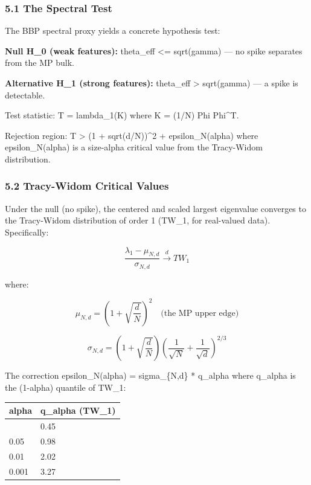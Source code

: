 \documentclass[
  12pt,
]{article}
\begin{document}
\subsubsection{5.1 The Spectral Test}\label{the-spectral-test}

The BBP spectral proxy yields a concrete hypothesis test:

\textbf{Null H\_0 (weak features):} theta\_eff \textless= sqrt(gamma)
--- no spike separates from the MP bulk.

\textbf{Alternative H\_1 (strong features):} theta\_eff \textgreater{}
sqrt(gamma) --- a spike is detectable.

Test statistic: T = lambda\_1(K) where K = (1/N) Phi Phi\^{}T.

Rejection region: T \textgreater{} (1 + sqrt(d/N))\^{}2 +
epsilon\_N(alpha) where epsilon\_N(alpha) is a size-alpha critical value
from the Tracy-Widom distribution.

\subsubsection{5.2 Tracy-Widom Critical
Values}\label{tracy-widom-critical-values}

Under the null (no spike), the centered and scaled largest eigenvalue
converges to the Tracy-Widom distribution of order 1 (TW\_1, for
real-valued data). Specifically:

\[\frac{\lambda_1 - \mu_{N,d}}{\sigma_{N,d}} \xrightarrow{d} TW_1\]

where:

\[\mu_{N,d} = \left(1 + \sqrt{\frac{d}{N}}\right)^2 \quad \text{(the MP upper edge)}\]

\[\sigma_{N,d} = \left(1 + \sqrt{\frac{d}{N}}\right) \left(\frac{1}{\sqrt{N}} + \frac{1}{\sqrt{d}}\right)^{2/3}\]

The correction epsilon\_N(alpha) = sigma\_\{N,d\} * q\_alpha where
q\_alpha is the (1-alpha) quantile of TW\_1:

\begin{longtable}[]{@{}ll@{}}
\toprule\noalign{}
alpha & q\_alpha (TW\_1) \\
\midrule\noalign{}
\endhead
\bottomrule\noalign{}
\endlastfoot
0.10 & 0.45 \\
0.05 & 0.98 \\
0.01 & 2.02 \\
0.001 & 3.27 \\
\end{longtable}
\end{document}
